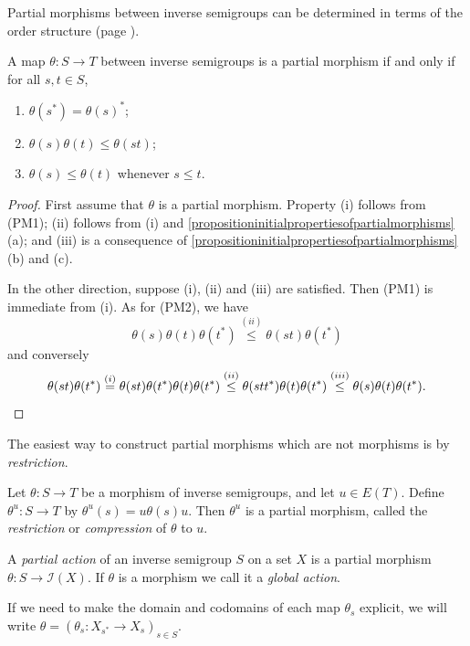 Partial morphisms between inverse semigroups can be determined in terms of the order structure (page \pageref{orderinversesemigroup}).

\begin{proposition}\label{propositionequivalencepartialmorphism}
A map $\theta:S\to T$ between inverse semigroups is a partial morphism if and only if for all $s,t\in S$,
\begin{enumerate}
\item[(i)] $\theta(s^*)=\theta(s)^*$;  
\item[(ii)] $\theta(s)\theta(t) \leq\theta(st)$;
\item[(iii)] $\theta(s)\leq\theta(t)$ whenever $s\leq t$.
\end{enumerate}
\end{proposition}
\begin{proof}
First assume that $\theta$ is a partial morphism. Property (i) follows from (PM1); (ii) follows from (i) and \ref{propositioninitialpropertiesofpartialmorphisms}(a); and (iii) is a consequence of \ref{propositioninitialpropertiesofpartialmorphisms}(b) and (c).

In the other direction, suppose (i), (ii) and (iii) are satisfied. Then (PM1) is immediate from (i). As for (PM2), we have
\[\theta(s)\theta(t)\theta(t^*)\overset{(ii)}{\leq}\theta(st)\theta(t^*)\]
and conversely
\[\theta(st)\theta(t^*)\overset{(i)}{=}\theta(st)\theta(t^*)\theta(t)\theta(t^*)\overset{(ii)}{\leq}\theta(stt^*)\theta(t)\theta(t^*)\overset{(iii)}{\leq}\theta(s)\theta(t)\theta(t^*).\qedhere\]
\end{proof}

The easiest way to construct partial morphisms which are not morphisms is by \emph{restriction}.

\begin{example}\label{examplecompressionabstract}
Let $\theta:S\to T$ be a morphism of inverse semigroups, and let $u\in E(T)$. Define $\theta^u:S\to T$ by $\theta^u(s)=u\theta(s)u$. Then $\theta^u$ is a partial morphism, called the \emph{restriction} or \emph{compression} of $\theta$ to $u$.
\end{example}

\begin{definition}[\cite{MR3231479}]\label{definitionactionspartialandglobal}
A \emph{partial action} of an inverse semigroup $S$ on a set $X$ is a partial morphism $\theta:S\to\mathcal{I}(X)$. If $\theta$ is a morphism we call it a \emph{global action}.

If we need to make the domain and codomains of each map $\theta_s$ explicit, we will write $\theta=(\theta_s:X_{s^*}\to X_s)_{s\in S}$.
\end{definition}

